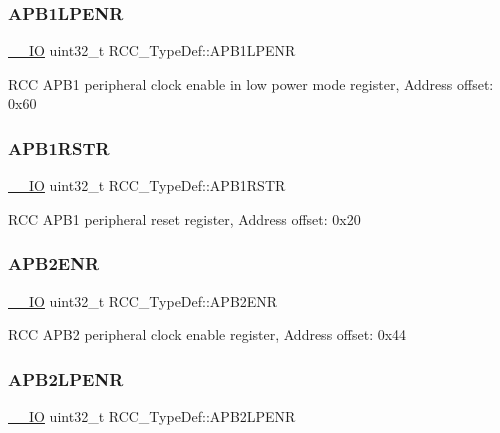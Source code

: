 \subsubsection{\texorpdfstring{APB1LPENR}{APB1LPENR}}
{\footnotesize\ttfamily \mbox{\hyperlink{core__sc300_8h_aec43007d9998a0a0e01faede4133d6be}{\+\_\+\+\_\+\+IO}} uint32\+\_\+t R\+C\+C\+\_\+\+Type\+Def\+::\+A\+P\+B1\+L\+P\+E\+NR}

R\+CC A\+P\+B1 peripheral clock enable in low power mode register, Address offset\+: 0x60 \mbox{\label{struct_r_c_c___type_def_a600f4d6d592f43edb2fc653c5cba023a}} 
\subsubsection{\texorpdfstring{APB1RSTR}{APB1RSTR}}
{\footnotesize\ttfamily \mbox{\hyperlink{core__sc300_8h_aec43007d9998a0a0e01faede4133d6be}{\+\_\+\+\_\+\+IO}} uint32\+\_\+t R\+C\+C\+\_\+\+Type\+Def\+::\+A\+P\+B1\+R\+S\+TR}

R\+CC A\+P\+B1 peripheral reset register, Address offset\+: 0x20 \mbox{\label{struct_r_c_c___type_def_a619b4c22f630a269dfd0c331f90f6868}} 
\subsubsection{\texorpdfstring{APB2ENR}{APB2ENR}}
{\footnotesize\ttfamily \mbox{\hyperlink{core__sc300_8h_aec43007d9998a0a0e01faede4133d6be}{\+\_\+\+\_\+\+IO}} uint32\+\_\+t R\+C\+C\+\_\+\+Type\+Def\+::\+A\+P\+B2\+E\+NR}

R\+CC A\+P\+B2 peripheral clock enable register, Address offset\+: 0x44 \mbox{\label{struct_r_c_c___type_def_a7e46c65220f00a6858a5b35b74a37b51}} 
\subsubsection{\texorpdfstring{APB2LPENR}{APB2LPENR}}
{\footnotesize\ttfamily \mbox{\hyperlink{core__sc300_8h_aec43007d9998a0a0e01faede4133d6be}{\+\_\+\+\_\+\+IO}} uint32\+\_\+t R\+C\+C\+\_\+\+Type\+Def\+::\+A\+P\+B2\+L\+P\+E\+NR}


